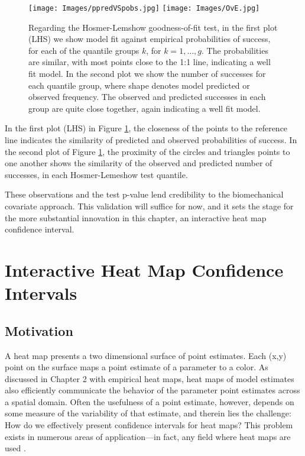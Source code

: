   \begin{figure}[!ht]
    \centering
    \texttt{[image: Images/ppredVSpobs.jpg]}
    \texttt{[image: Images/OvE.jpg]}
    \caption{Regarding the Hosmer-Lemshow goodness-of-fit test, in the first plot (LHS) we show model fit against empirical probabilities of success, for each of the quantile groups $k$, for $k = 1, \dots, g$. The probabilities are similar, with most points close to the 1:1 line, indicating a well fit model. In the second plot we show the number of successes for each quantile group, where shape denotes model predicted or observed frequency. The observed and predicted successes in each group are quite close together, again indicating a well fit model.}
    \label{fig:hoslem}
  \end{figure}
In the first plot (LHS) in Figure \ref{fig:hoslem}, the closeness of the points to the reference line indicates the similarity of predicted and observed probabilities of success. In the second plot of Figure \ref{fig:hoslem}, the proximity of the circles and triangles points to one another shows the similarity of the observed and predicted number of successes, in each Hosmer-Lemeshow test quantile. 

These observations and the test p-value lend credibility to the biomechanical covariate approach. This validation will suffice for now, and it sets the stage for the more substantial innovation in this chapter, an interactive heat map confidence interval.

\section{Interactive Heat Map Confidence Intervals}

\subsection{Motivation}

A heat map presents a two dimensional surface of point estimates. Each (x,y) point on the surface maps a point estimate of a parameter to a color. As discussed in Chapter 2 with empirical heat maps, heat maps of model estimates also efficiently communicate the behavior of the parameter point estimates across a spatial domain. Often the usefulness of a point estimate, however, depends on some measure of the variability of that estimate, and therein lies the challenge: How do we effectively present confidence intervals for heat maps? This problem exists in numerous areas of application---in fact, any field where heat maps are used \citep{Emerson}. 

